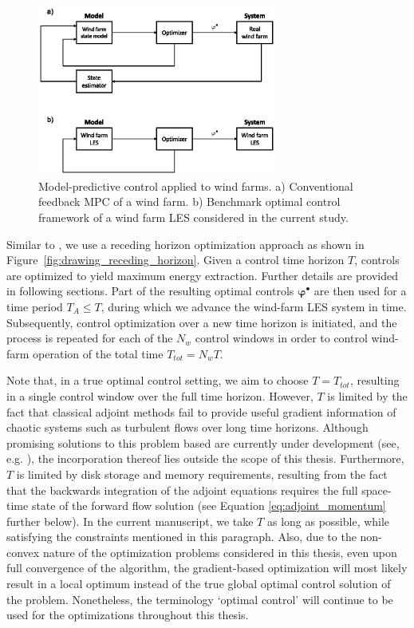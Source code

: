 \begin{figure}
	\centering
	\includegraphics[width=0.7\textwidth]{chapters/optimal_control_problem/figure1.eps}
	\caption[Model-predictive control approach applied to wind farms. Conventional MPC \& Benchmark optimal control framework applied in the current study.]{Model-predictive control applied to wind farms. a) Conventional feedback MPC of a wind farm. b) Benchmark optimal control framework of a wind farm LES considered in the current study.}\label{fig:block_diag}
\end{figure}

Similar to \cite{goit2015optimal}, we use a receding horizon optimization approach as shown in Figure~\ref{fig:drawing_receding_horizon}. Given a control time horizon $T$, controls are optimized to yield maximum energy extraction. Further details are provided in following sections. Part of the resulting optimal controls $\boldsymbol{\varphi}^{\bullet}$ are then used for a time period $T_A \leq T$, during which we advance the wind-farm LES system in time. Subsequently, control optimization over a new time horizon is initiated, and the process is repeated for each of the $N_w$ control windows in order to control wind-farm operation of the total time $T_{tot} = N_w T$. 

Note that, in a true optimal control setting, we aim to choose $T = T_{tot}$, resulting in a single control window over the full time horizon. However, $T$ is limited by the fact that classical adjoint methods fail to provide useful gradient information of chaotic systems such as turbulent flows over long time horizons. Although promising solutions to this problem based are currently under development (see, e.g. \citealp{wang2014least, chater2016simplified}), the incorporation thereof lies outside the scope of this thesis. Furthermore, $T$ is limited by disk storage and memory requirements, resulting from the fact that the backwards integration of the adjoint equations requires the full space-time state of the forward flow solution (see Equation \ref{eq:adjoint_momentum} further below). In the current manuscript, we take $T$ as long as possible, while satisfying the constraints mentioned in this paragraph. Also, due to the non-convex nature of the optimization problems considered in this thesis, even upon full convergence of the algorithm, the gradient-based optimization will most likely result in a local optimum instead of the true global optimal control solution of the problem. Nonetheless, the terminology `optimal control' will continue to be used for the optimizations throughout this thesis. 

